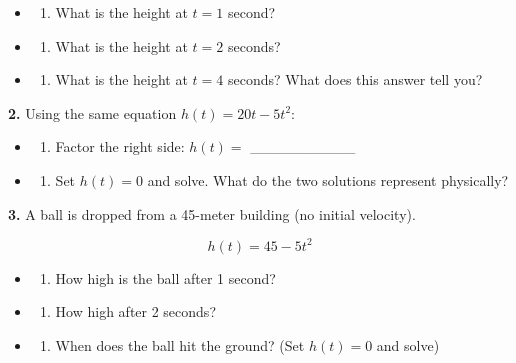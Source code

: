 \documentclass[
  11pt,
]{article}
\providecommand{\tightlist}{%
  \setlength{\itemsep}{0pt}\setlength{\parskip}{0pt}}
\begin{document}
\begin{itemize}
\item
  \begin{enumerate}
  \def\labelenumi{(\alph{enumi})}
  \tightlist
  \item
    What is the height at \(t = 1\) second?
  \end{enumerate}
\item
  \begin{enumerate}
  \def\labelenumi{(\alph{enumi})}
  \setcounter{enumi}{1}
  \tightlist
  \item
    What is the height at \(t = 2\) seconds?
  \end{enumerate}
\item
  \begin{enumerate}
  \def\labelenumi{(\alph{enumi})}
  \setcounter{enumi}{2}
  \tightlist
  \item
    What is the height at \(t = 4\) seconds? What does this answer tell
    you?
  \end{enumerate}
\end{itemize}

\textbf{2.} Using the same equation \(h(t) = 20t - 5t^2\):

\begin{itemize}
\item
  \begin{enumerate}
  \def\labelenumi{(\alph{enumi})}
  \tightlist
  \item
    Factor the right side: \(h(t) ={}\) \_\_\_\_\_\_\_\_\_\_
  \end{enumerate}
\item
  \begin{enumerate}
  \def\labelenumi{(\alph{enumi})}
  \setcounter{enumi}{1}
  \tightlist
  \item
    Set \(h(t) = 0\) and solve. What do the two solutions represent
    physically?
  \end{enumerate}
\end{itemize}

\textbf{3.} A ball is dropped from a 45-meter building (no initial
velocity).

\[h(t) = 45 - 5t^2\]

\begin{itemize}
\item
  \begin{enumerate}
  \def\labelenumi{(\alph{enumi})}
  \tightlist
  \item
    How high is the ball after 1 second?
  \end{enumerate}
\item
  \begin{enumerate}
  \def\labelenumi{(\alph{enumi})}
  \setcounter{enumi}{1}
  \tightlist
  \item
    How high after 2 seconds?
  \end{enumerate}
\item
  \begin{enumerate}
  \def\labelenumi{(\alph{enumi})}
  \setcounter{enumi}{2}
  \tightlist
  \item
    When does the ball hit the ground? (Set \(h(t) = 0\) and solve)
  \end{enumerate}
\end{itemize}
\end{document}
